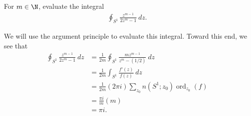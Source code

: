 \documentclass[10pt]{mypackage}
\begin{document}
\begin{problem}[Problem 5]
  For $m\in\N$, evaluate the integral
  \begin{align*}
    \oint_{S^{1}}^{} \frac{z^{m-1}}{2z^{m}-1}\:dz.
  \end{align*}
\end{problem}
\begin{solution}
  We will use the argument principle to evaluate this integral. Toward this end, we see that
  \begin{align*}
    \oint_{S^{1}}^{} \frac{z^{m-1}}{2z^{m}-1}\:dz &= \frac{1}{2m} \oint_{S^{1}}^{} \frac{mz^{m-1}}{z^{m}-\left( 1/2 \right)}\:dz\\
                                                  &= \frac{1}{2m} \int_{S^{1}}^{} \frac{f'(z)}{f(z)}\:dz\\
                                                  &= \frac{1}{2m} \left( 2\pi i \right)\sum_{z_0} n\left( S^{1};z_0 \right)\operatorname{ord}_{z_0}\left( f \right)\\
                                                  &= \frac{\pi i}{m} \left( m \right)\\
                                                  &= \pi i.
  \end{align*}
\end{solution}
\end{document}
